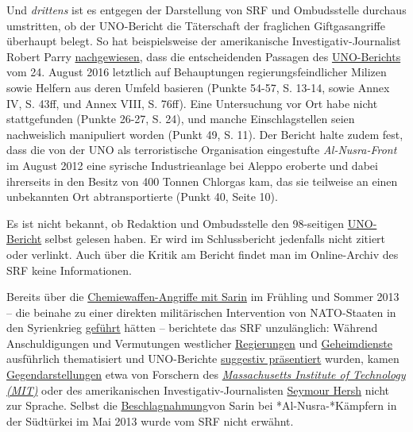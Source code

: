Und \emph{drittens} ist es entgegen der Darstellung von SRF und
Ombudsstelle durchaus umstritten, ob der UNO-Bericht die Täterschaft der
fraglichen Giftgasangriffe überhaupt belegt. So hat beispielsweise der
amerikanische Investigativ-Journalist Robert Parry
\href{https://consortiumnews.com/2016/09/08/un-team-heard-claims-of-staged-chemical-attacks/}{nachgewiesen},
dass die entscheidenden Passagen des
\href{http://daccess-ods.un.org/access.nsf/GetFile?OpenAgent\&DS=S/2016/738\&Lang=E\&Type=DOC}{UNO-Berichts}
vom 24. August 2016 letztlich auf Behauptungen regierungsfeindlicher
Milizen sowie Helfern aus deren Umfeld basieren (Punkte 54-57, S. 13-14,
sowie Annex IV, S. 43ff, und Annex VIII, S. 76ff). Eine Untersuchung vor
Ort habe nicht stattgefunden (Punkte 26-27, S. 24), und manche
Einschlagstellen seien nachweislich manipuliert worden (Punkt 49, S.
11). Der Bericht halte zudem fest, dass die von der UNO als
terroristische Organisation eingestufte \emph{Al-Nusra-Front} im August
2012 eine syrische Industrieanlage bei Aleppo eroberte und dabei
ihrerseits in den Besitz von 400 Tonnen Chlorgas kam, das sie teilweise
an einen unbekannten Ort abtransportierte (Punkt 40, Seite 10).

Es ist nicht bekannt, ob Redaktion und Ombudsstelle den 98-seitigen
\href{http://daccess-ods.un.org/access.nsf/GetFile?OpenAgent\&DS=S/2016/738\&Lang=E\&Type=PDF}{UNO-Bericht}
selbst gelesen haben. Er wird im Schlussbericht jedenfalls nicht zitiert
oder verlinkt. Auch über die Kritik am Bericht findet man im
Online-Archiv des SRF keine Informationen.

Bereits über die
\href{https://consortiumnews.com/2014/04/07/the-collapsing-syria-sarin-case/}{Chemiewaffen-Angriffe
mit Sarin} im Frühling und Sommer 2013 -- die beinahe zu einer direkten
militärischen Intervention von NATO-Staaten in den Syrienkrieg
\href{https://www.srf.ch/news/international/syrien-einsatz-der-usa-nimmt-erste-huerde}{geführt}
hätten -- berichtete das SRF unzulänglich: Während Anschuldigungen und
Vermutungen westlicher
\href{http://www.srf.ch/news/international/syrien-fuer-frankreich-ist-giftgas-angriff-erwiesen}{Regierungen}
und
\href{http://www.srf.ch/news/international/fuer-die-usa-ist-klar-assad-regime-steht-hinter-giftgas-einsatz}{Geheimdienste}
ausführlich thematisiert und UNO-Berichte
\href{https://www.srf.ch/news/international/syrienkonflikt-welche-partei-besitzt-fixfertiges-nervengas}{suggestiv
präsentiert} wurden, kamen
\href{http://www.nytimes.com/2013/12/29/world/middleeast/new-study-refines-view-of-sarin-attack-in-syria.html}{Gegendarstellungen}
etwa von Forschern des
\href{https://s3.amazonaws.com/s3.documentcloud.org/documents/1006045/possible-implications-of-bad-intelligence.pdf}{\emph{Massachusetts
Institute of Technology (MIT)}} oder des amerikanischen
Investigativ-Journalisten
\href{https://www.lrb.co.uk/v36/n08/seymour-m-hersh/the-red-line-and-the-rat-line}{Seymour
Hersh} nicht zur Sprache. Selbst die
\href{http://www.globalresearch.ca/turkish-police-find-chemical-weapons-in-the-possession-of-al-nusra-terrorists-heading-for-syria/5336917}{Beschlag­nahmung}von
Sarin bei *Al-Nusra-*Kämpfern in der Südtürkei im Mai 2013 wurde vom SRF
nicht erwähnt.

